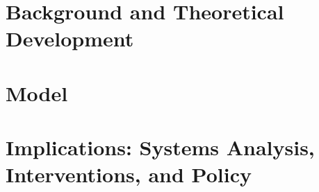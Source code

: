 

\part{Background and Theoretical Development} \label{part-background}






\part{Model} \label{part-model}



\part{Implications: Systems Analysis, Interventions, and Policy} \label{part-system}




